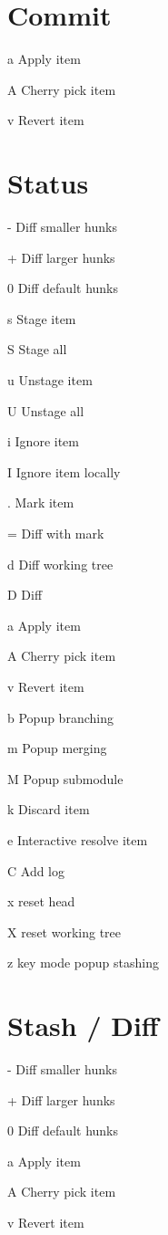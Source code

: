 \documentclass[11pt,a4paper]{article}
\begin{document}
\begin{multicols}{2}
\section{Commit}
\begin{eqlist}
\item[a] Apply item
\item[A] Cherry pick item
\item[v] Revert item
\end{eqlist}

\section{Status}
\begin{eqlist}
\item[-] Diff smaller hunks
\item[+] Diff larger hunks
\item[0] Diff default hunks
\item[s] Stage item
\item[S] Stage all
\item[u] Unstage item
\item[U] Unstage all
\item[i] Ignore item
\item[I] Ignore item locally
\item[.] Mark item
\item[=] Diff with mark
\item[d] Diff working tree
\item[D] Diff
\item[a] Apply item
\item[A] Cherry pick item
\item[v] Revert item
\item[b] Popup branching
\item[m] Popup merging
\item[M] Popup submodule
\item[k] Discard item
\item[e] Interactive resolve item
\item[C] Add log
\item[x] reset head
\item[X] reset working tree
\item[z] key mode popup stashing
\end{eqlist}

\section{Stash / Diff}
\begin{eqlist}
\item[-] Diff smaller hunks
\item[+] Diff larger hunks
\item[0] Diff default hunks
\item[a] Apply item
\item[A] Cherry pick item
\item[v] Revert item
\end{eqlist}


\end{multicols}
\end{document}
